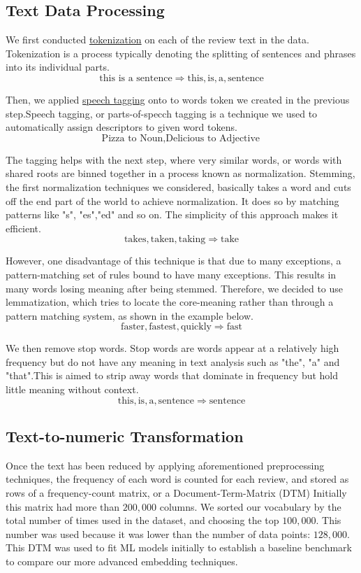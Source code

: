 \documentclass[letterpaper, 12 pt, conference]{ieeeconf}  %
\begin{document}
\subsection{Text Data Processing}
We first conducted \href{https://www.ibm.com/developerworks/community/blogs/nlp/entry/tokenization?lang=en}{tokenization} on each of the review text in the data. Tokenization is a process typically denoting the splitting of sentences and phrases into its individual parts. 
$$\text{this is a sentence} \Rightarrow \text{this},\text{is},\text{a},\text{sentence}$$

Then, we applied \href{http://language.worldofcomputing.net/pos-tagging/parts-of-speech-tagging.html}{speech tagging} onto to words token we created in the previous step.Speech tagging, or parts-of-specch tagging is a technique we used to automatically assign descriptors to given word tokens. 
$$\text{Pizza } \text{to } \text{Noun}, \text{Delicious } \text{to } \text{Adjective}$$

The tagging helps with the next step, where very similar words, or words with shared roots are binned together in a process known as normalization. Stemming, the first normalization techniques we considered, basically takes a word and cuts off the end part of the world to achieve normalization. It does so by matching patterns like "s", "es","ed" and so on. The simplicity of this approach makes it efficient. 
$$\text{takes}, \text{taken}, \text{taking}  \Rightarrow \text{take}$$

However, one disadvantage of this technique is that due to many exceptions, a pattern-matching set of rules bound to have many exceptions. This results in many words losing meaning after being stemmed. Therefore, we decided to use lemmatization, which tries to locate the core-meaning rather than through a pattern matching system, as shown in the example below.
$$\text{faster}, \text{fastest},\text{quickly} \Rightarrow \text{fast}$$

We then remove stop words. Stop words are words appear at a relatively high frequency but do not have any meaning in text analysis such as "the", "a" and "that".This is aimed to strip away words that dominate in frequency but hold little meaning without context.
$$\text{this}, \text{is}, \text{a}, \text{sentence} \Rightarrow \text{sentence}$$

\subsection{Text-to-numeric Transformation}
Once the text has been reduced by applying aforementioned preprocessing techniques, the frequency of each word is counted for each review, and stored as rows of a frequency-count matrix, or a Document-Term-Matrix (DTM) Initially this matrix had more than $200,000$ columns. We sorted our vocabulary by the total number of times used in the dataset, and choosing the top $100,000$. This number was used because it was lower than the number of data points: $128,000$. This DTM was used to fit ML models initially to establish a baseline benchmark to compare our more advanced embedding techniques.
\end{document}
